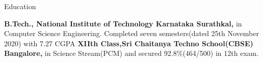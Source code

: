 \begin{rubric}{Education}

\entry*[2017 -- present]%
	\textbf{B.Tech., National Institute of Technology Karnataka Surathkal,} in Computer Science Engineering. Completed seven semesters(dated 25th November 2020) with 7.27 CGPA
%
\entry*[2015 -- 2017]%
	\textbf{XIIth Class,Sri Chaitanya Techno School(CBSE) Bangalore,} in  Science Stream(PCM) and secured 92.8\%(464/500) in 12th exam.
%
\end{rubric}